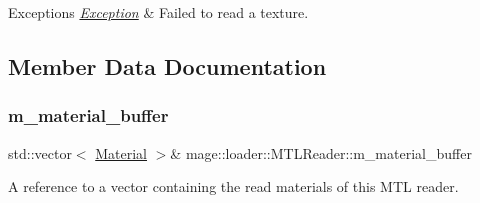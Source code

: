 \begin{DoxyExceptions}{Exceptions}
{\em \hyperlink{classmage_1_1_exception}{Exception}} & Failed to read a texture. \\
\hline
\end{DoxyExceptions}


\subsection{Member Data Documentation}
\hypertarget{classmage_1_1loader_1_1_m_t_l_reader_aefd5c533c3abb3cf5315084e853249ff}{}\label{classmage_1_1loader_1_1_m_t_l_reader_aefd5c533c3abb3cf5315084e853249ff} 
\subsubsection{\texorpdfstring{m\+\_\+material\+\_\+buffer}{m\_material\_buffer}}
{\footnotesize\ttfamily std\+::vector$<$ \hyperlink{classmage_1_1_material}{Material} $>$\& mage\+::loader\+::\+M\+T\+L\+Reader\+::m\+\_\+material\+\_\+buffer\hspace{0.3cm}{\ttfamily [private]}}

A reference to a vector containing the read materials of this M\+TL reader. 